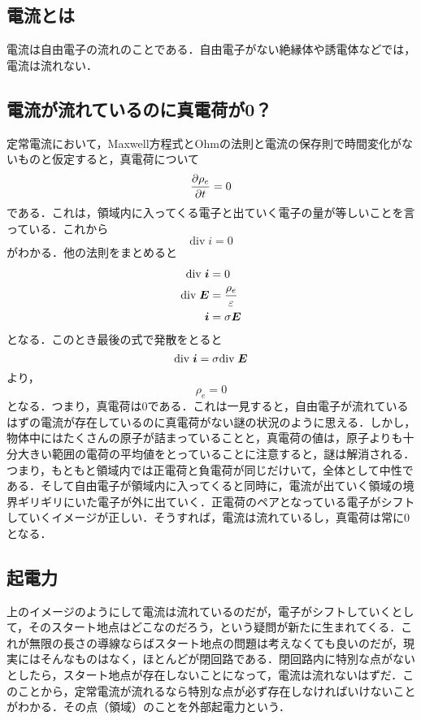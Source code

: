 \documentclass[a4paper,10pt,uplatex]{jsarticle}
\renewcommand{\div}{\mathrm{div}\;}
\newcommand{\E}{\vb*{E}}
\renewcommand{\i}{\vb*{i}}
\newcommand{\ds}{\displaystyle}
\begin{document}
\subsection{電流とは}
電流は自由電子の流れのことである．自由電子がない絶縁体や誘電体などでは，電流は流れない．

\subsection{電流が流れているのに真電荷が0？}
定常電流において，Maxwell方程式とOhmの法則と電流の保存則で時間変化がないものと仮定すると，真電荷について
\begin{equation}
    \pdv{\rho_e}{t} = 0
\end{equation}
である．これは，領域内に入ってくる電子と出ていく電子の量が等しいことを言っている．これから
\begin{equation}
    \div i = 0
\end{equation}
がわかる．他の法則をまとめると
\begin{align}
    \div \i &= 0 \\
    \div \E &= \ds \frac{\rho_e}{\varepsilon} \\
    \i &= \sigma \E
\end{align}
となる．このとき最後の式で発散をとると
\begin{equation}
    \div \i = \sigma \div \E
\end{equation}
より，
\begin{equation}
    \rho_e = 0
\end{equation}
となる．つまり，真電荷は0である．これは一見すると，自由電子が流れているはずの電流が存在しているのに真電荷がない謎の状況のように思える．しかし，物体中にはたくさんの原子が詰まっていることと，真電荷の値は，原子よりも十分大きい範囲の電荷の平均値をとっていることに注意すると，謎は解消される．つまり，もともと領域内では正電荷と負電荷が同じだけいて，全体として中性である．そして自由電子が領域内に入ってくると同時に，電流が出ていく領域の境界ギリギリにいた電子が外に出ていく．正電荷のペアとなっている電子がシフトしていくイメージが正しい．そうすれば，電流は流れているし，真電荷は常に0となる．

\subsection{起電力}
上のイメージのようにして電流は流れているのだが，電子がシフトしていくとして，そのスタート地点はどこなのだろう，という疑問が新たに生まれてくる．これが無限の長さの導線ならばスタート地点の問題は考えなくても良いのだが，現実にはそんなものはなく，ほとんどが閉回路である．閉回路内に特別な点がないとしたら，スタート地点が存在しないことになって，電流は流れないはずだ．このことから，定常電流が流れるなら特別な点が必ず存在しなければいけないことがわかる．その点（領域）のことを外部起電力という．
\end{document}
